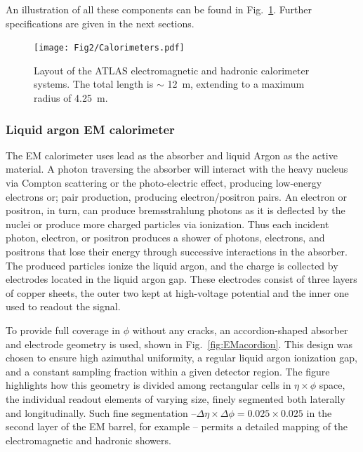An illustration of all these components can be found in Fig.~\ref{fig:figcalo}. Further specifications are given in the next sections.


\begin{figure}[htbp]
  \begin{center}
      \texttt{[image: Fig2/Calorimeters.pdf]}
    \caption{Layout of the ATLAS electromagnetic and hadronic calorimeter systems. The total length is $\sim$ 12~m, extending to a maximum radius of 4.25~m.}
    \label{fig:figcalo}
  \end{center}
\end{figure}


\subsubsection{Liquid argon EM calorimeter}
  
The EM calorimeter uses lead as the absorber and liquid Argon as the active material. A photon traversing the absorber will interact with the heavy nucleus via Compton scattering or the photo-electric effect, producing low-energy electrons or; pair production, producing electron/positron pairs. An electron or positron, in turn, can produce bremsstrahlung photons as it is deflected by the nuclei or produce more charged particles via ionization. Thus each incident photon, electron, or positron produces a shower of photons, electrons, and positrons that lose their energy through successive interactions in the absorber. The produced particles ionize the liquid argon, and the charge is collected by electrodes located in the liquid argon gap.  These electrodes consist of three layers of copper sheets, the outer two kept at high-voltage potential and the inner one used to readout the signal.

To provide full coverage in $\phi$ without any cracks, an accordion-shaped absorber and electrode geometry is used, shown in Fig.~\ref{fig:EMacordion}.  This design was chosen to ensure high azimuthal uniformity, a regular liquid argon ionization gap, and a constant sampling fraction within a given detector region. The figure highlights  how this geometry is divided among rectangular cells in $\eta \times \phi$ space, the individual readout elements of varying size,  finely segmented both laterally and longitudinally. Such fine segmentation $– \Delta \eta \times \Delta \phi = 0.025 \times 0.025$ in the second layer of the EM barrel, for example $–$ permits a detailed mapping of the electromagnetic and hadronic showers. 

